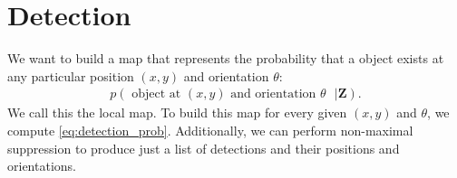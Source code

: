 \section{Detection}

We want to build a map that represents the probability that a object exists at
any particular position $(x, y)$ and orientation $\theta$:
%
\begin{align}
  p(\text{ object at $(x, y)$ and orientation $\theta$ } | \mathbf{Z})
  \text{.}
\end{align}
%
We call this the local map. To build this map for every given $(x, y)$ and
$\theta$, we compute \eqref{eq:detection_prob}. Additionally, we can perform
non-maximal suppression to produce just a list of detections and their positions
and orientations.
